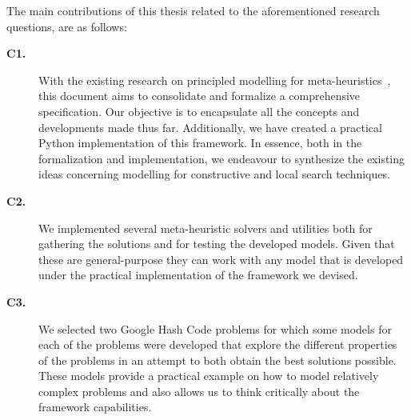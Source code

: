 The main contributions of this thesis related to the aforementioned research
questions, are as follows:

\vspace{0.5cm}

\begin{description}

  \item[\textbf{C1.}] With the existing research on principled modelling for
    meta-heuristics~\cite{vieira2009uma,fonseca2021nasf4nio,outeiro2021application},
    this document aims to consolidate and formalize a comprehensive specification.
    Our objective is to encapsulate all the concepts and developments made thus
    far. Additionally, we have created a practical Python implementation of this
    framework. In essence, both in the formalization and implementation, we
    endeavour to synthesize the existing ideas concerning modelling for
    constructive and local search techniques.

  \item[\textbf{C2.}] We implemented several meta-heuristic solvers and utilities
    both for gathering the solutions and for testing the developed models. Given
    that these are general-purpose they can work with any model that is developed
    under the practical implementation of the framework we devised.

  \item[\textbf{C3.}] We selected two Google Hash Code problems for which some
    models for each of the problems were developed that explore the different
    properties of the problems in an attempt to both obtain the best solutions
    possible. These models provide a practical example on how to model relatively
    complex problems and also allows us to think critically about the framework
    capabilities.
\end{description}